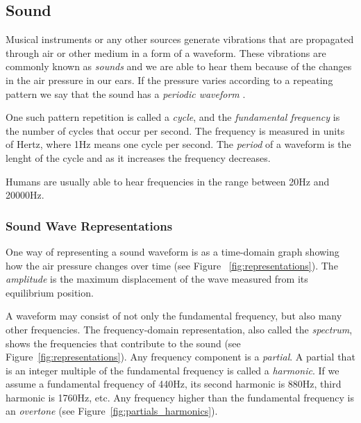 \documentclass[11pt]{article} %
\begin{document}
\subsection{Sound}
Musical instruments or any other sources generate vibrations that are propagated through air or other medium in a form of a waveform. These vibrations are commonly known as \textit{sounds} and we are able to hear them because of the changes in the air pressure in our ears. If the pressure varies according to a repeating pattern we say that the sound has a \textit{periodic waveform} \citep*{Roads1996}.

One such pattern repetition is called a \textit{cycle}, and the \textit{fundamental frequency} is the number of cycles that occur per second. The frequency is measured in units of Hertz, where 1Hz means one cycle per second. The \textit{period} of a waveform is the lenght of the cycle and as it increases the frequency decreases.

Humans are usually able to hear frequencies in the range between 20Hz and 20000Hz.

\subsubsection{Sound Wave Representations}
One way of representing a sound waveform is as a time-domain graph showing how the air pressure changes over time (see Figure ~\ref{fig:representations}). The \textit{amplitude} is the maximum displacement of the wave measured from its equilibrium position.

A waveform may consist of not only the fundamental frequency, but also many other frequencies. The frequency-domain representation, also called the \textit{spectrum}, shows the frequencies that contribute to the sound (see Figure~\ref{fig:representations}). Any frequency component is a \textit{partial}. A partial that is an integer multiple of the fundamental frequency is called a \textit{harmonic}. If we assume a fundamental frequency of 440Hz, its second harmonic is 880Hz, third harmonic is 1760Hz, etc. Any frequency higher than the fundamental frequency is an \textit{overtone} (see Figure~\ref{fig:partials_harmonics}).
\end{document}

